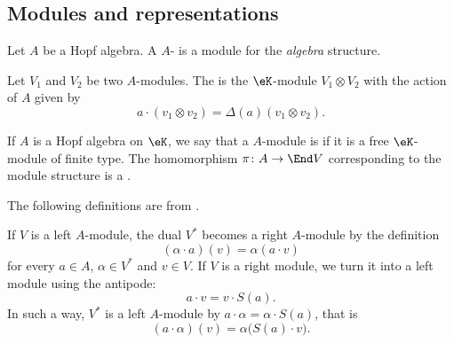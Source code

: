 \subsection{Modules and representations}
\label{SubSecMOdulREepe}

\begin{definition}
    Let \( A\) be a Hopf algebra. A \( A\)- is a module for the \emph{algebra} structure.
\end{definition}

Let \( V_1\) and \( V_2\) be two \( A\)-modules. The  is the \( \eK\)-module \( V_1\otimes V_2\) with the action of \( A\) given by
\begin{equation}
    a\cdot(v_1\otimes v_2)=\Delta(a)(v_1\otimes v_2).
\end{equation}

If \( A\) is a Hopf algebra on \( \eK\), we say that a \( A\)-module is  if it is a free \( \eK\)-module of finite type. The homomorphism \( \pi\colon A\to \End V\) corresponding to the module structure is a .

The following definitions are from \cite{RolandVertignioux}.

If \( V\) is a left \( A\)-module, the dual \( V^*\) becomes a right \( A\)-module by the definition
\begin{equation}
    (\alpha\cdot a)(v)=\alpha(a\cdot v)
\end{equation}
for every \( a\in A\), \( \alpha\in V^*\) and \( v\in V\). If \( V\) is a right module, we turn it into a left module using the antipode:
\begin{equation}
    a\cdot v=v\cdot S(a).
\end{equation}
In such a way, \( V^*\) is a left \( A\)-module by \( a\cdot\alpha=\alpha\cdot S(a)\), that is
\begin{equation}        \label{EqDefacctrleftUqGLstat}
    (a\cdot \alpha)(v)=\alpha\big( S(a)\cdot v \big).
\end{equation}

